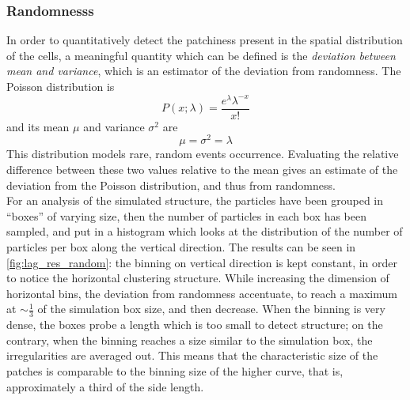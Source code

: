\subsubsection{Randomnesss} \label{sec:lag_res_random}
In order to quantitatively detect the patchiness present in the spatial distribution of the cells, a meaningful quantity which can be defined is the \textit{deviation between mean and variance}, which is an estimator of the deviation from randomness. The Poisson distribution is \autocite[chapter 8.5]{loreti2006teoria}
\[ P(x;\lambda) = \frac{e^\lambda \lambda^{-x}}{x!} \]
and its mean $\mu$ and variance $\sigma^2$ are
\[ \mu = \sigma^2 = \lambda \]
This distribution models rare, random events occurrence. Evaluating the relative difference between these two values relative to the mean gives an estimate of the deviation from the Poisson distribution, and thus from randomness. \\
For an analysis of the simulated structure, the particles have been grouped in ``boxes'' of varying size, then the number of particles in each box has been sampled, and put in a histogram which looks at the distribution of the number of particles per box along the vertical direction.
The results can be seen in \autoref{fig:lag_res_random}: the binning on vertical direction is kept constant, in order to notice the horizontal clustering structure. While increasing the dimension of horizontal bins, the deviation from randomness accentuate, to reach a maximum at $\sim\frac{1}{3}$ of the simulation box size, and then decrease. When the binning is very dense, the boxes probe a length which is too small to detect structure; on the contrary, when the binning reaches a size similar to the simulation box, the irregularities are averaged out. This means that the characteristic size of the patches is comparable to the binning size of the higher curve, that is, approximately a third of the side length. 

